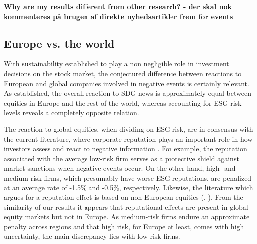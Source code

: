 \textbf{Why are my results different from other research? - der skal nok kommenteres på brugen af direkte nyhedsartikler frem for events}




\subsection{Europe vs. the world}

With sustainability established to play a non negligible role in investment decisions on the stock market, the conjectured difference between reactions to European and global companies involved in negative events is certainly relevant. As established, the overall reaction to SDG news is approximately equal between equities in Europe and the rest of the world, whereas accounting for ESG risk levels reveals a completely opposite relation.

The reaction to global equities, when dividing on ESG risk, are in consensus with the current literature, where corporate reputation plays an important role in how investors assess and react to negative information \citep{godfrey2009relationship}. For example, the reputation associated with the average low-risk firm serves as a protective shield against market sanctions when negative events occur. On the other hand, high- and medium-risk firms, which presumably have worse ESG reputations, are penalized at an average rate of -1.5\% and -0.5\%, respectively. Likewise, the literature which argues for a reputation effect is based on non-European equities (\cite{Blancard_ESG_sentiment}, \cite{flammer2013corporate}). 
From the similarity of our results it appears that reputational effects are present in global equity markets but not in Europe.  As medium-risk firms endure an approximate penalty across regions and that high risk, for Europe at least, comes with high uncertainty, the main discrepancy lies with low-risk firms.  

